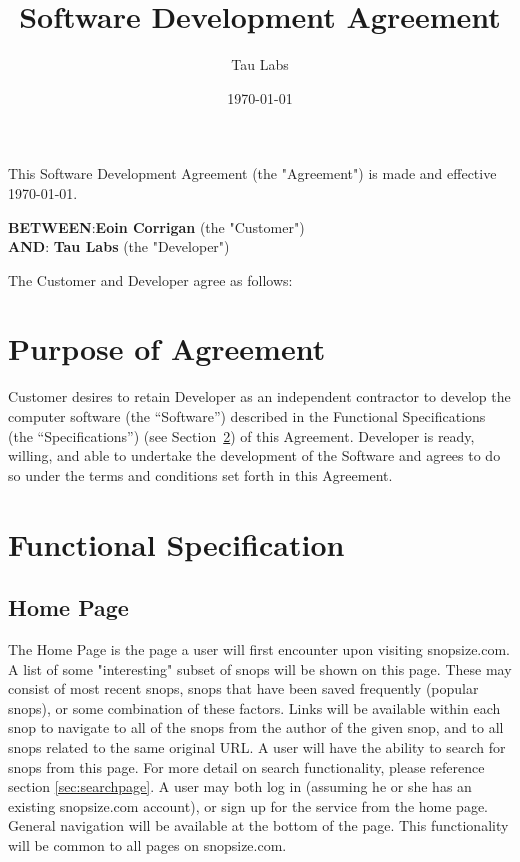 \documentclass[11pt]{article}
\begin{document}
\title{Software Development Agreement}
\author{Tau Labs}
\date{\today}
\maketitle
\section*{}
This Software Development Agreement (the "Agreement") is made and effective {\today}.
\begin{tabbing}
{\bf BETWEEN}:\hspace{0.2in}\={\bf Eoin Corrigan} (the "Customer") \\
{\bf AND}:\> {\bf Tau Labs } (the "Developer") 
\end{tabbing}
The Customer and Developer agree as follows:
\section{Purpose of Agreement}
Customer desires to retain Developer as an independent contractor to develop the computer software (the “Software”) described in the Functional Specifications (the “Specifications”) (see Section~\ref{sec:functionalspec}) of this Agreement. Developer is ready, willing, and able to undertake the development of the Software and agrees to do so under the terms and conditions set forth in this Agreement.
\section{Functional Specification}
\label{sec:functionalspec}
\subsection{Home Page}
The Home Page is the page a user will first encounter upon visiting snopsize.com. A list of some "interesting" subset of snops will be shown on this page. These may consist of most recent snops, snops that have been saved frequently (popular snops), or some combination of these factors. Links will be available within each snop to navigate to all of the snops from the author of the given snop, and to all snops related to the same original URL. A user will have the ability to search for snops from this page. For more detail on search functionality, please reference section \ref{sec:searchpage}. A user may both log in (assuming he or she has an existing snopsize.com account), or sign up for the service from the home page. General navigation will be available at the bottom of the page. This functionality will be common to all pages on snopsize.com.
\end{document}
